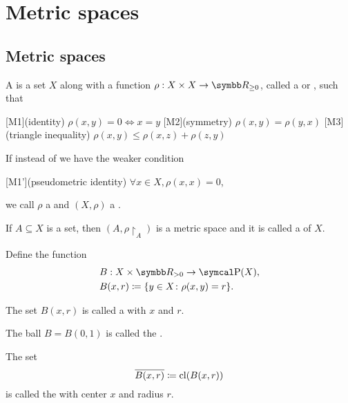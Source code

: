 \section{Metric spaces}\label{sec:metric_spaces}
\subsection{Metric spaces}\label{subsec:metric_spaces}

\begin{definition}\label{def:metric_space}\cite[248]{Engelking1989}
  A  is a set \( X \) along with a function \( \rho: X \times X \to \BR_{\geq 0} \), called a  or , such that
  \begin{defenum}[series=def:metric_space]
    [M1](identity) \( \rho(x, y) = 0 \iff x = y \)
    [M2](symmetry) \( \rho(x, y) = \rho(y, x) \)
    [M3](triangle inequality) \( \rho(x, y) \leq \rho(x, z) + \rho(z, y) \)
  \end{defenum}

  If instead of  we have the weaker condition
  \begin{defenum}[resume=def:metric_space]
    [M1'](pseudometric identity) \( \forall x \in X, \rho(x, x) = 0 \),
  \end{defenum}
  we call \( \rho \) a  and \( (X, \rho) \) a .

  \begin{defenum}
     If \( A \subseteq X \) is a set, then \( (A, \rho{\restriction_A}) \) is a metric space and it is called a  of $X$.

     Define the function
    \begin{align*}
      &B: X \times \BR_{>0} \to \Power(X), \\
      &B(x, r) \coloneqq \{ y \in X \colon \rho(x, y) = r \}.
    \end{align*}

    The set \( B(x, r) \) is called a  with  \( x \) and  \( r \).

    The ball \( B = B(0, 1) \) is called the .

     The set
    \begin{equation*}
      \overline{B(x, r)} \coloneqq \operatorname{cl}(B(x, r))
    \end{equation*}
    is called the  with center \( x \) and radius \( r \).


\end{defenum}
\end{definition}
